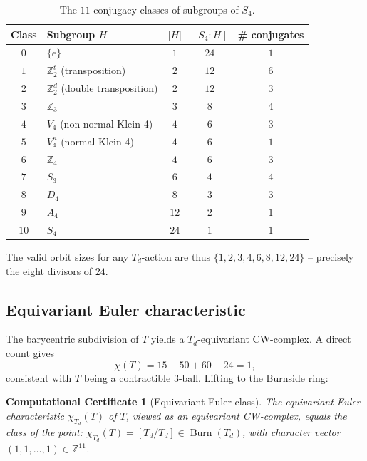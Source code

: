 \documentclass[11pt,a4paper]{article}
\theoremstyle{plain}
\newtheorem{computationalcertificate}[computationalcertificate]{Computational Certificate}
\theoremstyle{definition}
\theoremstyle{remark}
\DeclareMathOperator{\Burn}{Burn}
\newcommand{\Td}{T_{\!d}}
\newcommand{\Z}{\mathbb{Z}}
\begin{document}
\begin{table}[H]
\centering\small
\caption{The $11$ conjugacy classes of subgroups of $S_{4}$.}
\label{tab:s4-subgroups}
\begin{tabular}{@{}c l c c c@{}}
\toprule
Class & Subgroup $H$ & $|H|$ & $[S_{4}:H]$ & \# conjugates \\
\midrule
$0$  & $\{e\}$                                & $1$  & $24$ & $1$ \\
$1$  & $\Z_{2}^{t}$ (transposition)            & $2$  & $12$ & $6$ \\
$2$  & $\Z_{2}^{d}$ (double transposition)     & $2$  & $12$ & $3$ \\
$3$  & $\Z_{3}$                                & $3$  & $8$  & $4$ \\
$4$  & $V_{4}$ (non-normal Klein-4)            & $4$  & $6$  & $3$ \\
$5$  & $V_{4}^{n}$ (normal Klein-4)            & $4$  & $6$  & $1$ \\
$6$  & $\Z_{4}$                                & $4$  & $6$  & $3$ \\
$7$  & $S_{3}$                                 & $6$  & $4$  & $4$ \\
$8$  & $D_{4}$                                 & $8$  & $3$  & $3$ \\
$9$  & $A_{4}$                                 & $12$ & $2$  & $1$ \\
$10$ & $S_{4}$                                 & $24$ & $1$  & $1$ \\
\bottomrule
\end{tabular}
\end{table}

The valid orbit sizes for any $\Td$-action are thus
$\{1,2,3,4,6,8,12,24\}$ -- precisely the eight divisors of $24$.

\subsection{Equivariant Euler characteristic}

The barycentric subdivision of $T$ yields a $\Td$-equivariant
CW-complex.  A direct count gives
\begin{equation}\label{eq:chi-T}
  \chi(T) = 15 - 50 + 60 - 24 = 1,
\end{equation}
consistent with $T$ being a contractible $3$-ball.  Lifting to the Burnside
ring:
\begin{computationalcertificate}[Equivariant Euler class]\label{prop:chi-T}
The equivariant Euler characteristic $\chi_{\Td}(T)$ of $T$, viewed as an
equivariant CW-complex, equals the class of the point:
$\chi_{\Td}(T) = [\Td/\Td] \in \Burn(\Td)$, with character vector
$(1,1,\ldots,1) \in \Z^{11}$.
\end{computationalcertificate}
\end{document}

